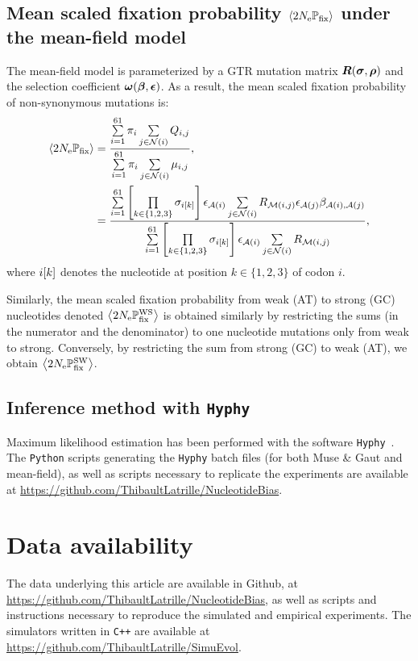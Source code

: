 \documentclass{article}
\begin{document}
\subsection{Mean scaled fixation probability $\left\langle 2 N_{\text{e}} \mathbb{P}_{\text{fix}} \right\rangle$ under the mean-field model}
\label{sec:mut-bias-mean-field-omega}
The mean-field model is parameterized by a {GTR} mutation matrix $\bm{R}(\bm{\sigma}, \bm{\rho})$ and the selection coefficient $\bm{\omega}(\bm{\beta}, \bm{\epsilon})$.
As a result, the mean scaled fixation probability of {non-synonymous} mutations is:
\begin{align}
 \left\langle 2 N_{\text{e}} \mathbb{P}_{\text{fix}} \right\rangle & = \dfrac{ \sum\limits_{{i}=1}^{61} \pi_{{i}} \sum\limits_{{j} \in \mathcal{N}\left({i}\right)} Q_{{i}, {j}}}{ \sum\limits_{{i}=1}^{61} \pi_{{i}} \sum\limits_{{j} \in \mathcal{N}\left({i}\right)} \mu_{{i}, {j}}}, \\
 & = \dfrac{ \sum\limits_{{i}=1}^{61} \left[\prod\limits_{k \in \{ 1, 2, 3 \}} \sigma_{{i}[k]}\right] \epsilon_{\mathcal{A}({i})} \sum\limits_{{j} \in \mathcal{N}\left({i}\right)} R_{\mathcal{M}({i}, {j})} \epsilon_{\mathcal{A}({j})} \beta_{\mathcal{A}({i}), \mathcal{A}({j})} }{\sum\limits_{{i}=1}^{61} \left[\prod\limits_{k \in \{ 1, 2, 3 \}} \sigma_{{i}[k]}\right] \epsilon_{\mathcal{A}({i})} \sum\limits_{{j} \in \mathcal{N}\left({i}\right)} R_{\mathcal{M}({i}, {j})}},
\end{align}
where ${i}[k]$ denotes the nucleotide at position $k \in \{ 1, 2, 3 \}$ of codon $i$.

Similarly, the mean scaled fixation probability from weak (AT) to strong (GC) nucleotides denoted $\left\langle 2 N_{\text{e}} \mathbb{P}_{\text{fix}}^{\text{WS}} \right\rangle$ is obtained similarly by restricting the sums (in the numerator and the denominator) to one nucleotide mutations only from weak to strong.
Conversely, by restricting the sum from strong (GC) to weak (AT), we obtain $\left\langle 2 N_{\text{e}} \mathbb{P}_{\text{fix}}^{\text{SW}} \right\rangle$.

\subsection{Inference method with \texttt{Hyphy}}
\label{subsec:inference-method-with-hyphy}

Maximum {likelihood} estimation has been performed with the software \texttt{Hyphy}~\citep{Pond2005}.
The \texttt{Python} scripts generating the \texttt{Hyphy} batch files (for both Muse \& Gaut and mean-field), as well as scripts necessary to replicate the experiments are available at \url{https://github.com/ThibaultLatrille/NucleotideBias}.

\section{Data availability}
The data underlying this article are available in Github, at \url{https://github.com/ThibaultLatrille/NucleotideBias}, as well as scripts and instructions necessary to reproduce the simulated and empirical experiments.
The simulators written in \texttt{C++} are available at \url{https://github.com/ThibaultLatrille/SimuEvol}.
\end{document}
